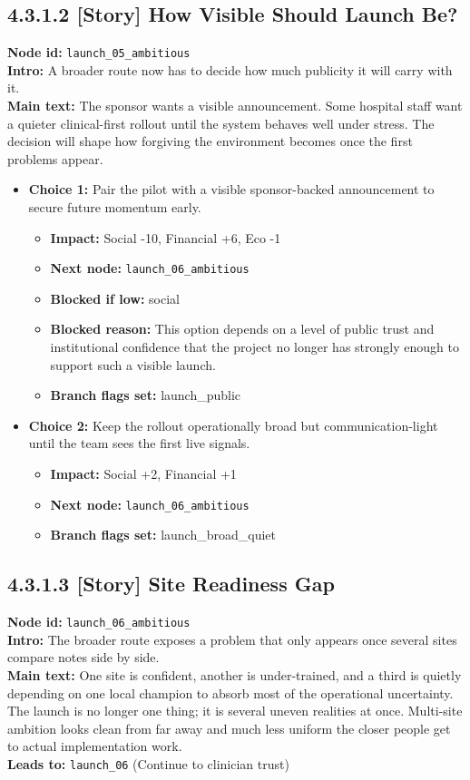 \documentclass[11pt]{article}
\begin{document}
\subsection*{4.3.1.2 [Story] How Visible Should Launch Be?}
\textbf{Node id:} \texttt{launch\_05\_ambitious}\\
\textbf{Intro:} A broader route now has to decide how much publicity it will carry with it.\\
\textbf{Main text:} The sponsor wants a visible announcement. Some hospital staff want a quieter clinical-first rollout until the system behaves well under stress. The decision will shape how forgiving the environment becomes once the first problems appear.\\
\begin{itemize}
\item \textbf{Choice 1:} Pair the pilot with a visible sponsor-backed announcement to secure future momentum early.
\begin{itemize}
\item \textbf{Impact:} Social -10, Financial +6, Eco -1
\item \textbf{Next node:} \texttt{launch\_06\_ambitious}
\item \textbf{Blocked if low:} social
\item \textbf{Blocked reason:} This option depends on a level of public trust and institutional confidence that the project no longer has strongly enough to support such a visible launch.
\item \textbf{Branch flags set:} launch\_public
\end{itemize}
\item \textbf{Choice 2:} Keep the rollout operationally broad but communication-light until the team sees the first live signals.
\begin{itemize}
\item \textbf{Impact:} Social +2, Financial +1
\item \textbf{Next node:} \texttt{launch\_06\_ambitious}
\item \textbf{Branch flags set:} launch\_broad\_quiet
\end{itemize}
\end{itemize}
\subsection*{4.3.1.3 [Story] Site Readiness Gap}
\textbf{Node id:} \texttt{launch\_06\_ambitious}\\
\textbf{Intro:} The broader route exposes a problem that only appears once several sites compare notes side by side.\\
\textbf{Main text:} One site is confident, another is under-trained, and a third is quietly depending on one local champion to absorb most of the operational uncertainty. The launch is no longer one thing; it is several uneven realities at once. Multi-site ambition looks clean from far away and much less uniform the closer people get to actual implementation work.\\
\textbf{Leads to:} \texttt{launch\_06} (Continue to clinician trust)\\
\end{document}
